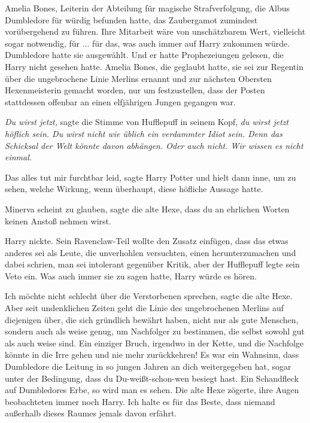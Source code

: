 Amelia Bones, Leiterin der Abteilung für magische Strafverfolgung, die Albus
Dumbledore für würdig befunden hatte, das Zaubergamot zumindest vorübergehend zu
führen. Ihre Mitarbeit wäre von unschätzbarem Wert, vielleicht sogar notwendig,
für ... für das, was auch immer auf Harry zukommen würde. Dumbledore hatte sie
ausgewählt. Und er hatte Prophezeiungen gelesen, die Harry nicht gesehen hatte.
Amelia Bones, die geglaubt hatte, sie sei zur Regentin über die ungebrochene
Linie Merlins ernannt und zur nächsten Obersten Hexenmeisterin gemacht worden,
nur um festzustellen, dass der Posten stattdessen offenbar an einen elfjährigen
Jungen gegangen war.

\emph{Du wirst jetzt,} sagte die Stimme von Hufflepuff in seinem Kopf,\emph{ du
wirst jetzt höflich sein. Du wirst nicht wie üblich ein verdammter Idiot sein.
Denn das Schicksal der Welt könnte davon abhängen. Oder auch nicht. Wir wissen
es nicht einmal.}

\glqq{}Das alles tut mir furchtbar leid\grqq{}, sagte Harry Potter und hielt dann
inne, um zu sehen, welche Wirkung, wenn überhaupt, diese höfliche Aussage hatte.

\glqq{}Minerva scheint zu glauben\grqq{}, sagte die alte Hexe, \glqq{}dass du an
ehrlichen Worten keinen Anstoß nehmen wirst.\grqq{}

Harry nickte. Sein Ravenclaw-Teil wollte den Zusatz einfügen, dass das etwas
anderes sei als Leute, die unverhohlen versuchten, einen herunterzumachen und
dabei schrien, man sei intolerant gegenüber Kritik, aber der Hufflepuff legte
sein Veto ein. Was auch immer sie zu sagen hatte, Harry würde es hören.

\glqq{}Ich möchte nicht schlecht über die Verstorbenen sprechen\grqq{}, sagte die
alte Hexe. \glqq{}Aber seit undenklichen Zeiten geht die Linie des ungebrochenen
Merlins auf diejenigen über, die sich gründlich bewährt haben, nicht nur als
gute Menschen, sondern auch als weise genug, um Nachfolger zu bestimmen, die
selbst sowohl gut als auch weise sind. Ein einziger Bruch, irgendwo in der
Kette, und die Nachfolge könnte in die Irre gehen und nie mehr zurückkehren! Es
war ein Wahnsinn, dass Dumbledore die Leitung in so jungen Jahren an dich
weitergegeben hat, sogar unter der Bedingung, dass du Du-weißt-schon-wen besiegt
hast. Ein Schandfleck auf Dumbledores Erbe, so wird man es sehen.\grqq{} Die alte Hexe
zögerte, ihre Augen beobachteten immer noch Harry. \glqq{}Ich halte es für das
Beste, dass niemand außerhalb dieses Raumes jemals davon erfährt.\grqq{}

